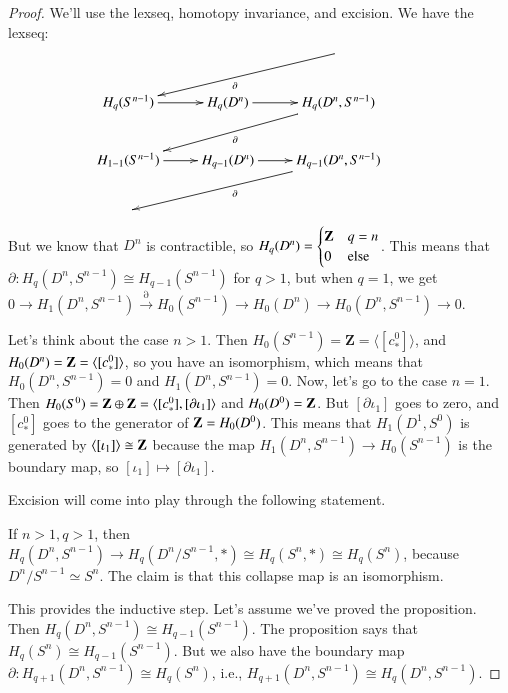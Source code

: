 \begin{proof}
We'll use the lexseq, homotopy invariance, and excision. We have the lexseq:
\begin{equation*}
\xymatrix{ & & \ar[dll]^\partial\\
 H_q(S^{n-1})\ar[r] & H_q(D^n)\ar[r] & H_q(D^n,S^{n-1})\ar[dll]^\partial\\
 H_{1-1}(S^{n-1})\ar[r] & H_{q-1}(D^n)\ar[r] & H_{q-1}(D^n,S^{n-1})\ar[dll]^\partial\\
 & & &}
\end{equation*}
But we know that $D^n$ is contractible, so $ H_q(D^n)=\begin{cases}\mathbf Z & q=n\\ 0 & \text{else}\end{cases}$. This means that $\partial: H_q(D^n,S^{n-1})\cong H_{q-1}(S^{n-1})$ for $q>1$, but when $q=1$, we get $0\to H_1(D^n,S^{n-1})\xrightarrow{\partial} H_0(S^{n-1})\to H_0(D^n) \to H_0(D^n,S^{n-1})\to 0$.

Let's think about the case $n>1$. Then $ H_0(S^{n-1})=\mathbf{Z}=\langle[c^0_\ast]\rangle$, and $ H_0(D^n)=\mathbf Z=\langle[c^0_\ast]\rangle$, so you have an isomorphism, which means that $ H_0(D^n,S^{n-1})=0$ and $ H_1(D^n,S^{n-1})=0$. Now, let's go to the case $n=1$. Then $ H_0(S^0)=\mathbf Z\oplus\mathbf Z=\langle [c^0_\ast],[\partial\iota_1]\rangle$ and $ H_0(D^0)=\mathbf Z$. But $[\partial\iota_1]$ goes to zero, and $[c^0_\ast]$ goes to the generator of $\mathbf Z= H_0(D^0)$. This means that $ H_1(D^1,S^0)$ is generated by $\langle[\iota_1]\rangle\cong\mathbf Z$ because the map $ H_1(D^n,S^{n-1})\to H_0(S^{n-1})$ is the boundary map, so $[\iota_1]\mapsto [\partial\iota_1]$.

Excision will come into play through the following statement.
\begin{prop}
If $n>1,q>1$, then $ H_q(D^n,S^{n-1})\to H_q(D^n/S^{n-1},\ast)\cong H_q(S^n,\ast)\cong H_q(S^n)$, because $D^n/S^{n-1}\simeq S^n$. The claim is that this collapse map is an isomorphism.
\end{prop}
This provides the inductive step. Let's assume we've proved the proposition. Then $ H_q(D^n,S^{n-1})\cong H_{q-1}(S^{n-1})$. The proposition says that $ H_q(S^n)\cong H_{q-1}(S^{n-1})$. But we also have the boundary map $\partial: H_{q+1}(D^n,S^{n-1})\cong H_q(S^n)$, i.e., $ H_{q+1}(D^n,S^{n-1})\cong H_q(D^n,S^{n-1})$.


\end{proof}
